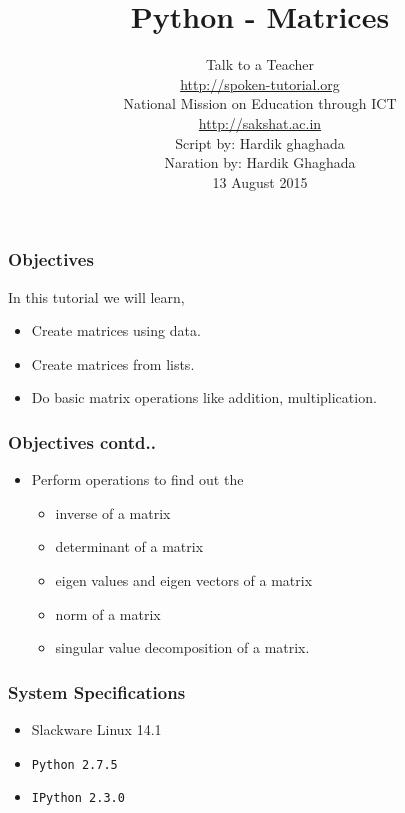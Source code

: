 \documentclass[17pt,compress]{beamer}
\author[FOSSEE]{}
\institute[IIT Bombay]{}
\date[]{}
\begin{document}
\sffamily \bfseries
\title
[Matrices]
{Python - Matrices}
\author
[FOSSEE, IIT - Bombay]
{\small Talk to a Teacher\\{\color{blue}\url{http://spoken-tutorial.org}}\\National Mission on Education
 through ICT\\{\color{blue}\url{http://sakshat.ac.in}} \\[0.5cm]{\tiny Script by: Hardik ghaghada \\ Naration by: Hardik Ghaghada \\ 13 August 2015}}

\begin{frame}
   \titlepage
\end{frame}
\begin{frame}
\frametitle{Objectives}
\label{sec-2}

  In this tutorial we will learn, \pause

\begin{itemize}
\item Create matrices using data.\pause
\item Create matrices from lists.\pause
\item Do basic matrix operations like addition, multiplication.
\end{itemize}
\end{frame}
\begin{frame}
\frametitle{Objectives contd..}
\label{sec-2.2}
\begin{itemize}
\item Perform operations to find out the
	\begin{itemize}
	\item inverse of a matrix\pause
	\item determinant of a matrix\pause
	\item eigen values and eigen vectors of a matrix\pause
	\item norm of a matrix\pause
	\item singular value decomposition of a matrix.
	\end{itemize}
\end{itemize}
\end{frame}
\begin{frame}
\frametitle{System Specifications}\pause
\begin{itemize}
\item Slackware Linux 14.1\pause
\item \texttt{Python 2.7.5} \pause
\item \texttt{IPython 2.3.0}
\end{itemize}
\end{frame}
\end{document}
